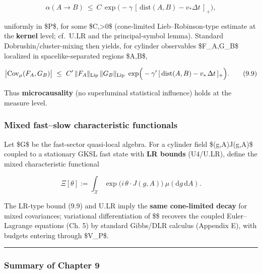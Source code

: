\documentclass[
]{article}
\numberwithin{equation}{section}
\begin{document}
\[
\alpha(A\to B)\ \le\ C\,\exp\!\Big(-\gamma\,[\,\mathrm{dist}(A,B)-v_\ast\Delta t\,]_+\Big),
\tag{9.8}
\]

uniformly in \$P\$, for some \$C,\gamma\textgreater0\$ (cone-limited
Lieb--Robinson-type estimate at the \textbf{kernel} level; cf.~U.LR and
the principal-symbol lemma). Standard Dobrushin/cluster-mixing then
yields, for cylinder observables \$F\_A,G\_B\$ localized in
spacelike-separated regions \$A,B\$,

\[
\big|\mathrm{Cov}_\mu(F_A,G_B)\big|\ \le\ C'\,\|F_A\|_{\rm Lip}\,\|G_B\|_{\rm Lip}\ \exp\!\Big(-\gamma'\,[\,\mathrm{dist}(A,B)-v_\ast\,\Delta t\,]_+\Big).
\tag{9.9}
\]

Thus \textbf{microcausality} (no superluminal statistical influence)
holds at the measure level.

\hypertarget{mixed-fastslow-characteristic-functionals}{%
\subsubsection{Mixed fast--slow characteristic
functionals}\label{mixed-fastslow-characteristic-functionals}}

Let \$\mathcal G\$ be the fast-sector quasi-local algebra. For a
cylinder field \$(g,A)\mapsto J(g,A)\$ coupled to a stationary GKSL fast
state with \textbf{LR bounds} (U4/U.LR), define the mixed characteristic
functional

\[
\Xi[\theta]:=\int_{\mathcal X}\!\exp\!\Big(i\,\theta\cdot J(g,A)\Big)\ \mu(\mathrm d g\,\mathrm d A).
\]

The LR-type bound (9.9) and U.LR imply the \textbf{same cone-limited
decay} for mixed covariances; variational differentiation of \$\Xi\$
recovers the coupled Euler--Lagrange equations (Ch. 5) by standard
Gibbs/DLR calculus (Appendix E), with budgets entering through \$V\_P\$.

\begin{center}\rule{0.5\linewidth}{0.5pt}\end{center}

\hypertarget{summary-of-chapter-9}{%
\subsubsection{Summary of Chapter 9}\label{summary-of-chapter-9}}
\end{document}
